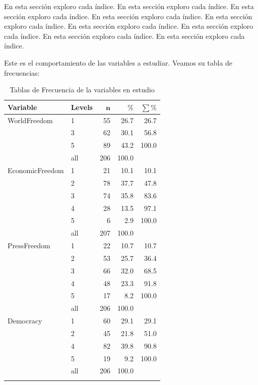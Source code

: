 \documentclass{article}
\begin{document}
En esta sección exploro cada índice. En esta sección exploro cada índice. En esta sección exploro cada índice. En esta sección exploro cada índice. En esta sección exploro cada índice. En esta sección exploro cada índice. En esta sección exploro cada índice. En esta sección exploro cada índice. En esta sección exploro cada índice.





Este es el comportamiento de las variables a estudiar. Veamos su tabla de frecuencias:

\begingroup\footnotesize
\begin{longtable}{llrrr}
\caption{Tablas de Frecuencia de la variables en estudio} \\ 
 \textbf{Variable} & \textbf{Levels} & $\mathbf{n}$ & $\mathbf{\%}$ & $\mathbf{\sum \%}$ \\ 
  \hline \hline
WorldFreedom & 1 & 55 & 26.7 & 26.7 \\ 
   & 3 & 62 & 30.1 & 56.8 \\ 
   & 5 & 89 & 43.2 & 100.0 \\ 
   \hline
 & all & 206 & 100.0 &  \\ 
   \hline
\hline
EconomicFreedom & 1 & 21 & 10.1 & 10.1 \\ 
   & 2 & 78 & 37.7 & 47.8 \\ 
   & 3 & 74 & 35.8 & 83.6 \\ 
   & 4 & 28 & 13.5 & 97.1 \\ 
   & 5 & 6 & 2.9 & 100.0 \\ 
   \hline
 & all & 207 & 100.0 &  \\ 
   \hline
\hline
PressFreedom & 1 & 22 & 10.7 & 10.7 \\ 
   & 2 & 53 & 25.7 & 36.4 \\ 
   & 3 & 66 & 32.0 & 68.5 \\ 
   & 4 & 48 & 23.3 & 91.8 \\ 
   & 5 & 17 & 8.2 & 100.0 \\ 
   \hline
 & all & 206 & 100.0 &  \\ 
   \hline
\hline
Democracy & 1 & 60 & 29.1 & 29.1 \\ 
   & 2 & 45 & 21.8 & 51.0 \\ 
   & 4 & 82 & 39.8 & 90.8 \\ 
   & 5 & 19 & 9.2 & 100.0 \\ 
   \hline
 & all & 206 & 100.0 &  \\ 
   \hline
\hline
\hline
\label{}
\end{longtable}
\endgroup
\end{document}

